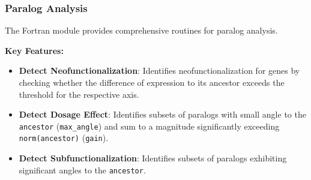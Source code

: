 \subsubsection{Paralog Analysis}
The Fortran module provides comprehensive routines for paralog analysis.

\textbf{Key Features:}
\begin{itemize}
    \item \textbf{Detect Neofunctionalization}: Identifies neofunctionalization for genes by checking whether the difference of expression to its ancestor exceeds the threshold for the respective axis.
    \item \textbf{Detect Dosage Effect}: Identifies subsets of paralogs with small angle to the \lstinline!ancestor! (\lstinline!max_angle!) and sum to a magnitude significantly exceeding \lstinline!norm(ancestor)! (\lstinline!gain!).
    \item \textbf{Detect Subfunctionalization}: Identifies subsets of paralogs exhibiting significant angles to the \lstinline!ancestor!.
\end{itemize}

